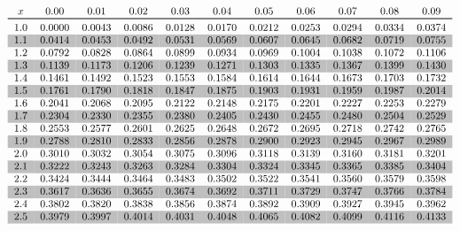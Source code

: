 \documentclass[12pt]{article}
\begin{document}
\begin{equation*}
\begin{tabular}{*{11}{c}}
$x$ & 0.00 & 0.01 & 0.02 & 0.03 & 0.04 & 0.05 & 0.06 & 0.07 & 0.08 & 0.09 \\ \toprule
1.0 & 0.0000 & 0.0043 & 0.0086 & 0.0128 & 0.0170 & 0.0212 & 0.0253 & 0.0294 & 0.0334 & 0.0374 \\
\rowcolor[gray]{0.75}
1.1 & 0.0414 & 0.0453 & 0.0492 & 0.0531 & 0.0569 & 0.0607 & 0.0645 & 0.0682 & 0.0719 & 0.0755 \\
1.2 & 0.0792 & 0.0828 & 0.0864 & 0.0899 & 0.0934 & 0.0969 & 0.1004 & 0.1038 & 0.1072 & 0.1106 \\
\rowcolor[gray]{0.75}
1.3 & 0.1139 & 0.1173 & 0.1206 & 0.1239 & 0.1271 & 0.1303 & 0.1335 & 0.1367 & 0.1399 & 0.1430 \\
1.4 & 0.1461 & 0.1492 & 0.1523 & 0.1553 & 0.1584 & 0.1614 & 0.1644 & 0.1673 & 0.1703 & 0.1732 \\
\rowcolor[gray]{0.75}
1.5 & 0.1761 & 0.1790 & 0.1818 & 0.1847 & 0.1875 & 0.1903 & 0.1931 & 0.1959 & 0.1987 & 0.2014 \\
1.6 & 0.2041 & 0.2068 & 0.2095 & 0.2122 & 0.2148 & 0.2175 & 0.2201 & 0.2227 & 0.2253 & 0.2279 \\
\rowcolor[gray]{0.75}
1.7 & 0.2304 & 0.2330 & 0.2355 & 0.2380 & 0.2405 & 0.2430 & 0.2455 & 0.2480 & 0.2504 & 0.2529 \\
1.8 & 0.2553 & 0.2577 & 0.2601 & 0.2625 & 0.2648 & 0.2672 & 0.2695 & 0.2718 & 0.2742 & 0.2765 \\
\rowcolor[gray]{0.75}
1.9 & 0.2788 & 0.2810 & 0.2833 & 0.2856 & 0.2878 & 0.2900 & 0.2923 & 0.2945 & 0.2967 & 0.2989 \\
2.0 & 0.3010 & 0.3032 & 0.3054 & 0.3075 & 0.3096 & 0.3118 & 0.3139 & 0.3160 & 0.3181 & 0.3201 \\
\rowcolor[gray]{0.75}
2.1 & 0.3222 & 0.3243 & 0.3263 & 0.3284 & 0.3304 & 0.3324 & 0.3345 & 0.3365 & 0.3385 & 0.3404 \\
2.2 & 0.3424 & 0.3444 & 0.3464 & 0.3483 & 0.3502 & 0.3522 & 0.3541 & 0.3560 & 0.3579 & 0.3598 \\
\rowcolor[gray]{0.75}
2.3 & 0.3617 & 0.3636 & 0.3655 & 0.3674 & 0.3692 & 0.3711 & 0.3729 & 0.3747 & 0.3766 & 0.3784 \\
2.4 & 0.3802 & 0.3820 & 0.3838 & 0.3856 & 0.3874 & 0.3892 & 0.3909 & 0.3927 & 0.3945 & 0.3962 \\
\rowcolor[gray]{0.75}
2.5 & 0.3979 & 0.3997 & 0.4014 & 0.4031 & 0.4048 & 0.4065 & 0.4082 & 0.4099 & 0.4116 & 0.4133 \\

\end{tabular}
\end{equation*}
\end{document}
